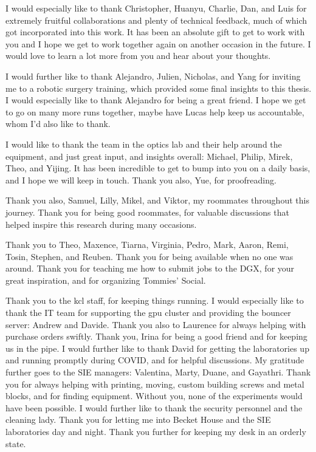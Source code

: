 I would especially like to thank Christopher, Huanyu, Charlie, Dan, and Luis for extremely fruitful collaborations and plenty of technical feedback, much of which got incorporated into this work. It has been an absolute gift to get to work with you and I hope we get to work together again on another occasion in the future. I would love to learn a lot more from you and hear about your thoughts.

I would further like to thank Alejandro, Julien, Nicholas, and Yang for inviting me to a robotic surgery training, which provided some final insights to this thesis. I would especially like to thank Alejandro for being a great friend. I hope we get to go on many more runs together, maybe have Lucas help keep us accountable, whom I'd also like to thank.

I would like to thank the team in the optics lab and their help around the equipment, and just great input, and insights overall: Michael, Philip, Mirek, Theo, and Yijing. It has been incredible to get to bump into you on a daily basis, and I hope we will keep in touch. Thank you also, Yue, for proofreading.

Thank you also, Samuel, Lilly, Mikel, and Viktor, my roommates throughout this journey. Thank you for being good roommates, for valuable discussions that helped inspire this research during many occasions.

Thank you to Theo, Maxence, Tiarna, Virginia, Pedro, Mark, Aaron, Remi, Tosin, Stephen, and Reuben. Thank you for being available when no one was around. Thank you for teaching me how to submit jobs to the DGX, for your great inspiration, and for organizing Tommies' Social.

Thank you to the \gls{kcl} staff, for keeping things running. I would especially like to thank the IT team for supporting the \gls{gpu} cluster and providing the bouncer server: Andrew and Davide. Thank you also to Laurence for always helping with purchase orders swiftly. Thank you, Irina for being a good friend and for keeping us in the pipe. I would further like to thank David for getting the laboratories up and running promptly during COVID, and for helpful discussions. My gratitude further goes to the SIE managers: Valentina, Marty, Duane, and Gayathri. Thank you for always helping with printing, moving, custom building screws and metal blocks, and for finding equipment. Without you, none of the experiments would have been possible. I would further like to thank the security personnel and the cleaning lady. Thank you for letting me into Becket House and the SIE laboratories day and night. Thank you further for keeping my desk in an orderly state.

